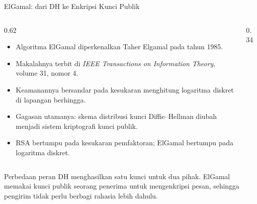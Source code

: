 \documentclass[aspectratio=169,11pt]{beamer}
\begin{document}
\begin{frame}{ElGamal: dari DH ke Enkripsi Kunci Publik}
    \begin{columns}[T,onlytextwidth]
        \begin{column}{0.62\textwidth}
            \footnotesize
            \begin{itemize}
                \item Algoritma ElGamal diperkenalkan Taher Elgamal pada
                      tahun 1985.
                \item Makalahnya terbit di \textit{IEEE Transactions on
                      Information Theory}, volume 31, nomor 4.
                \item Keamanannya bersandar pada kesukaran menghitung
                      logaritma diskret di lapangan berhingga.
                \item Gagasan utamanya: skema distribusi kunci
                      Diffie--Hellman diubah menjadi sistem kriptografi
                      kunci publik.
                \item RSA bertumpu pada kesukaran pemfaktoran; ElGamal
                      bertumpu pada logaritma diskret.
            \end{itemize}
        \end{column}
        \begin{column}{0.34\textwidth}
            \centering
        \end{column}
    \end{columns}
    \vspace{0.1cm}
    \begin{exampleblock}{Perbedaan peran}
        \footnotesize
        DH menghasilkan satu kunci untuk dua pihak. ElGamal memakai
        kunci publik seorang penerima untuk mengenkripsi pesan, sehingga
        pengirim tidak perlu berbagi rahasia lebih dahulu.
    \end{exampleblock}
\end{frame}
\end{document}
